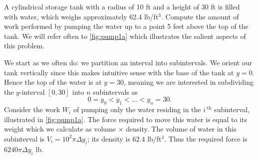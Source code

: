 \begin{example}\label{ex_pump1}
A cylindrical storage tank with a radius of 10 ft and a height of 30 ft is filled with water, which weighs approximately 62.4 lb/ft$^3$. Compute the amount of work performed by pumping the water up to a point 5 feet above the top of the tank.
\solution
We will refer often to \autoref{fig:pump1a} which illustrates the salient aspects of this problem.


We start as we often do: we partition an interval into subintervals. We orient our tank vertically since this makes intuitive sense with the base of the tank at $y=0$. Hence the top of the water is at $y=30$, meaning we are interested in subdividing the $y$-interval $[0,30]$ into $n$ subintervals as 
\[0 = y_0 < y_1 < \dots < y_n = 30.\]
Consider the work $W_i$ of pumping only the water residing in the $i\,^\text{th}$ subinterval, illustrated in \autoref{fig:pump1a}. The force required to move this water is equal to its weight which we calculate as volume $\times $ density. The volume of water in this subinterval is 
$V_i = 10^2\pi \Delta y_i$; its density is $62.4$ lb/ft$^3$. Thus the required force is $6240\pi\Delta y_i$ lb.


\end{example}
